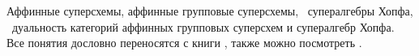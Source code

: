 Аффинные суперсхемы, аффинные групповые суперсхемы, \
супералгебры Хопфа, \
дуальность категорий аффинных групповых суперсхем и супералгебр Хопфа.
Все понятия дословно переносятся с книги \cite{jantzen}, также можно посмотреть \cite{affine_quotients}.